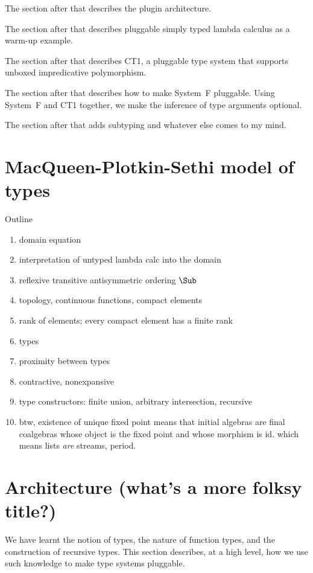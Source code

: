 \documentclass{amsart}
\begin{document}
The section after that describes the plugin architecture.

The section after that describes pluggable simply typed lambda
calculus as a warm-up example.

The section after that describes CT1, a pluggable type system
that supports unboxed impredicative polymorphism.

The section after that describes how to make System~F pluggable.
Using System~F and CT1 together, we make the inference of type
arguments optional.

The section after that adds subtyping and whatever else comes to
my mind.


\section{MacQueen-Plotkin-Sethi model of types}

Outline
\begin{enumerate}
\item domain equation
\item interpretation of untyped lambda calc into the domain
\item reflexive transitive antisymmetric ordering $\Sub$
\item topology, continuous functions, compact elements
\item rank of elements; every compact element has a finite rank
\item types
\item proximity between types
\item contractive, nonexpansive
\item type constructors: finite union, arbitrary intersection,
recursive
\item btw, existence of unique fixed point means that initial
algebras are final coalgebras whose object is the fixed point and
whose morphism is id. which means lists \emph{are} streams, period.
\end{enumerate}


\section{Architecture (what's a more folksy title?)}

We have learnt the notion of types, the nature of function types,
and the construction of recursive types. This section describes,
at a high level, how we use such knowledge to make type systems
pluggable.
\end{document}
